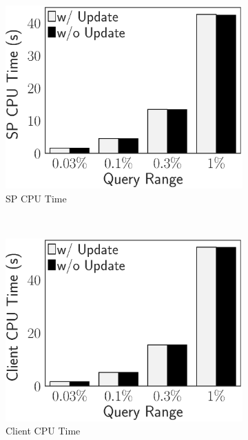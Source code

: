 \begin{figure}[t]
    \centering
    \begin{subfigure}{.33\linewidth}
        \includegraphics[height=\ht\figbox]{exp-figs/access-control/update_sp.eps}
        \caption{SP CPU Time}
    \end{subfigure}~%
    \begin{subfigure}{.33\linewidth}
        \includegraphics[height=\ht\figbox]{exp-figs/access-control/update_user.eps}
        \caption{Client CPU Time}
    \end{subfigure}~%
    \begin{subfigure}{.33\linewidth}

\end{subfigure}
\end{figure}
